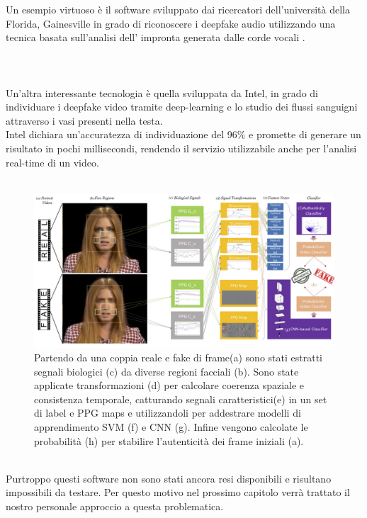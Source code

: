 \documentclass[12pt, a4paper]{article}
\begin{document}
Un esempio virtuoso è il software sviluppato dai ricercatori dell'università della Florida, Gainesville in grado di riconoscere i deepfake audio utilizzando una tecnica basata sull'analisi dell' impronta generata dalle corde vocali \cite{280020}. \\\\\\\\
Un'altra interessante tecnologia è quella sviluppata da Intel, in grado di individuare i deepfake video tramite deep-learning e lo studio dei flussi sanguigni attraverso i vasi presenti nella testa.\\
Intel dichiara un'accuratezza di individuazione del 96\% e promette di generare un risultato in pochi millisecondi, rendendo il servizio utilizzabile anche per l'analisi real-time di un video.\cite{DBLP:journals/corr/abs-1901-02212} \\\\
\begin{figure}[h]
    \centering
    \includegraphics[width=1\textwidth]{img/bloodDetector.png}
    \caption{Partendo da una coppia reale e fake di frame(a) sono stati estratti segnali biologici (c) da diverse regioni facciali (b). Sono state applicate transformazioni (d) per calcolare coerenza spaziale e consistenza temporale, catturando segnali caratteristici(e) in un set di label e PPG maps e utilizzandoli per addestrare modelli di apprendimento SVM (f) e CNN (g). Infine vengono calcolate le probabilità (h) per stabilire l'autenticità dei frame iniziali (a). }
    \label{fig:mesh1}
\end{figure} \\
Purtroppo questi software non sono stati ancora resi disponibili e risultano impossibili da testare. Per questo motivo nel prossimo capitolo verrà trattato il nostro personale approccio a questa problematica.
\newpage
\end{document}
